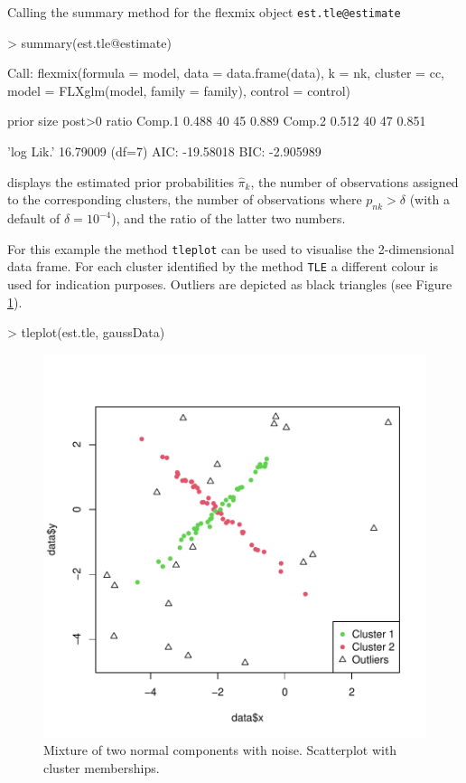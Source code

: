 \documentclass[article,shortnames,nojss]{jss}
\begin{document}
Calling the summary method for the flexmix object \texttt{est.tle@estimate}
\begin{Schunk}
\begin{Sinput}
> summary(est.tle@estimate)
\end{Sinput}
\begin{Soutput}
Call:
flexmix(formula = model, data = data.frame(data), 
    k = nk, cluster = cc, model = FLXglm(model, family = family), 
    control = control)

       prior size post>0 ratio
Comp.1 0.488   40     45 0.889
Comp.2 0.512   40     47 0.851

'log Lik.' 16.79009 (df=7)
AIC: -19.58018   BIC: -2.905989 
\end{Soutput}
\end{Schunk}
displays the estimated prior probabilities $\hat\pi_k$, the
number of observations assigned to the corresponding clusters, the
number of observations where $p_{nk}>\delta$ (with a default of
$\delta=10^{-4}$), and the ratio of the latter two numbers.

For this example the method \texttt{tleplot} can be used to visualise the 2-dimensional data frame. For each cluster identified by the method \texttt{TLE} a different colour is used for indication purposes. Outliers are depicted as black triangles (see Figure \ref{fig:normal}).
\begin{Schunk}
\begin{Sinput}
> tleplot(est.tle, gaussData)
\end{Sinput}
\end{Schunk}

\begin{figure}[htbp]
  \centering
\includegraphics{tlemix-intro-010}
  \caption{Mixture of two normal components with noise. Scatterplot
  with cluster memberships.}
  \label{fig:normal}
\end{figure}
\end{document}
